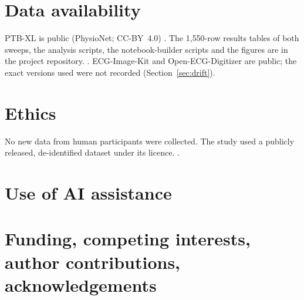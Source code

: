 \section*{Data availability}
PTB-XL is public (PhysioNet; CC-BY~4.0) \citep{ref45}. The 1{,}550-row results tables of both sweeps, the analysis scripts, the notebook-builder scripts and the figures are in the project repository. . ECG-Image-Kit \citep{ref1} and Open-ECG-Digitizer \citep{ref5} are public; the exact versions used were not recorded (Section~\ref{sec:drift}).

\section*{Ethics}
No new data from human participants were collected. The study used a publicly released, de-identified dataset under its licence. .

\section*{Use of AI assistance}

\section*{Funding, competing interests, author contributions, acknowledgements}
